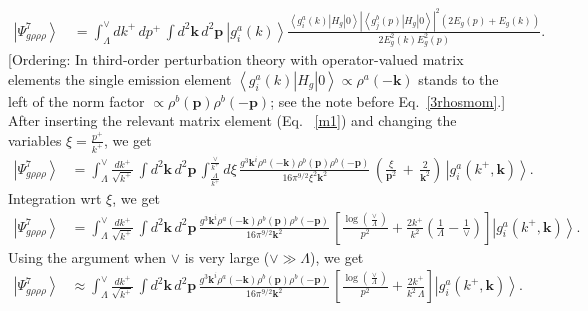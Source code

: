 \documentclass[aps,prd,amsmath,amssymb,nofootinbib]{revtex4-2}
\numberwithin{equation}{section}
\begin{document}
\begin{figure}[h]
    \label{fig:3}
\end{figure}
\begin{align}\label{degen}
\left|\Psi_{g\rho\rho\rho}^{7}\right\rangle \, & = \int_{\Lambda}^{\vee}dk^{+}\, dp^{+}\,\int d^{2}\mathbf{k}\, d^{2}\mathbf{p}\:\left|g_{i}^{a}(k)\right\rangle \frac{\left\langle g_{i}^{a}(k)\left|H_{g}\right|0\right\rangle\left|\left\langle g_{j}^{b}(p)\left|H_{g}\right|0\right\rangle \right|^{2} (2E_{g}(p)+E_{g}(k))}{2E_{g}^{2}(k)E_{g}^{2}(p)}.
\end{align} [Ordering: In third-order perturbation theory with operator-valued matrix elements the single emission element $\left\langle g_{i}^{a}(k)\left|H_{g}\right|0\right\rangle\propto\rho^a(-\mathbf{k})$ stands to the left of the norm factor $\propto\rho^b(\mathbf{p})\rho^b(-\mathbf{p})$; see the note before Eq.~\eqref{3rhosmom}.] After inserting the relevant matrix element (Eq.~ \eqref{m1}) and changing the variables $\xi = \frac{p^{+}}{k^{+}}$, we get
\begin{align} \label{virtual}
  \left|\Psi_{g\rho\rho\rho}^{7}\right\rangle & =\int_{\Lambda}^{\vee}\frac{dk^{+}}{\sqrt{k^{+}}}\,\int d^{2}\mathbf{k}\, d^{2}\mathbf{p}\,\int_{\frac{\Lambda}{k^{+}}}^{\frac{\vee}{k^{+}}}d\xi\,\frac{g^{3}\mathbf{k}^{i}\rho^{a}(-\mathbf{k})\rho^{b}(\mathbf{p})\rho^{b}(-\mathbf{p})}{16\pi^{9/2}\xi^{2}\mathbf{k}^{2}}\,\left(\frac{\xi}{\mathbf{p}^{2}}\,+\,\frac{2}{\mathbf{k}^{2}}\right)\,\left|g_{i}^{a}(k^{+},\mathbf{k})\right\rangle.
\end{align}
Integration wrt $\xi$, we get
\begin{align} \label{zetainteg}
  \left|\Psi_{g\rho\rho\rho}^{7}\right\rangle & =\int_{\Lambda}^{\vee}\frac{dk^{+}}{\sqrt{k^{+}}}\,\int d^{2}\mathbf{k}\, d^{2}\mathbf{p}\,\frac{g^{3}\mathbf{k}^{i}\rho^{a}(-\mathbf{k})\rho^{b}(\mathbf{p})\rho^{b}(-\mathbf{p})}{16\pi^{9/2}\mathbf{k}^{2}}\,\left[\frac{\log{\left(\frac{\vee}{\Lambda}\right)}}{p^{2}}+\frac{2k^{+}}{k^{2}}\left(\frac{1}{\Lambda} - \frac{1}{\vee}\right)\right]\left|g_{i}^{a}(k^{+},\mathbf{k})\right\rangle. 
\end{align}
Using the argument when $\vee$ is very large ($\vee\gg\Lambda$), we get
\begin{align}
     \left|\Psi_{g\rho\rho\rho}^{7}\right\rangle & \approx \int_{\Lambda}^{\vee}\frac{dk^{+}}{\sqrt{k^{+}}}\,\int d^{2}\mathbf{k}\, d^{2}\mathbf{p}\,\frac{g^{3}\mathbf{k}^{i}\rho^{a}(-\mathbf{k})\rho^{b}(\mathbf{p})\rho^{b}(-\mathbf{p})}{16\pi^{9/2}\mathbf{k}^{2}}\,\left[\frac{\log{\left(\frac{\vee}{\Lambda}\right)}}{p^{2}}+\frac{2k^{+}}{k^{2}\,\Lambda}\right]\left|g_{i}^{a}(k^{+},\mathbf{k})\right\rangle. 
\end{align}
\end{document}
